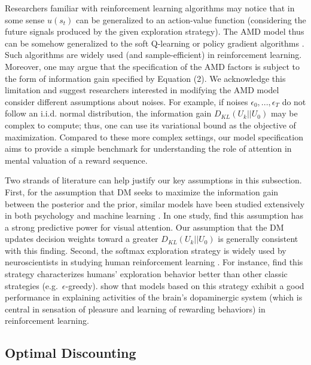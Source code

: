 \documentclass[
  12pt,
]{article}
\begin{document}
Researchers familiar with reinforcement learning algorithms may notice
that in some sense \(u(s_t)\) can be generalized to an action-value
function (considering the future signals produced by the given
exploration strategy). The AMD model thus can be somehow generalized to
the soft Q-learning or policy gradient algorithms
\citep{haarnoja2017reinforcement, schulman2017equivalence}. Such
algorithms are widely used (and sample-efficient) in reinforcement
learning. Moreover, one may argue that the specification of the AMD
factors is subject to the form of information gain specified by Equation
(2). We acknowledge this limitation and suggest researchers interested
in modifying the AMD model consider different assumptions about noises.
For example, if noises \(\epsilon_0,...,\epsilon_T\) do not follow an
i.i.d. normal distribution, the information gain \(D_{KL}(U_k||U_0)\)
may be complex to compute; thus, one can use its variational bound as
the objective of maximization\citep{houthooft2016vime}. Compared to
these more complex settings, our model specification aims to provide a
simple benchmark for understanding the role of attention in mental
valuation of a reward sequence.

Two strands of literature can help justify our key assumptions in this
subsection. First, for the assumption that DM seeks to maximize the
information gain between the posterior and the prior, similar models
have been studied extensively in both psychology
\citep{oaksford1994rational, itti2009bayesian, friston2017active} and
machine learning \citep{settles2009active, ren2021survey}. In one study,
\citet{itti2009bayesian} find this assumption has a strong predictive
power for visual attention. Our assumption that the DM updates decision
weights toward a greater \(D_{KL}(U_k||U_0)\) is generally consistent
with this finding. Second, the softmax exploration strategy is widely
used by neuroscientists in studying human reinforcement learning
\citep{daw2006cortical, fitzgerald2012action, collins2014opponent, niv2015reinforcement, leong2017dynamic}.
For instance, \citet{daw2006cortical} find this strategy characterizes
humans' exploration behavior better than other classic strategies
(e.g.~\(\epsilon\)-greedy). \citet{collins2014opponent} show that models
based on this strategy exhibit a good performance in explaining
activities of the brain's dopaminergic system (which is central in
sensation of pleasure and learning of rewarding behaviors) in
reinforcement learning.

\hypertarget{optimal-discounting}{%
\subsection{\texorpdfstring{Optimal Discounting
\label{optimal_discount}}{Optimal Discounting }}\label{optimal-discounting}}
\end{document}
